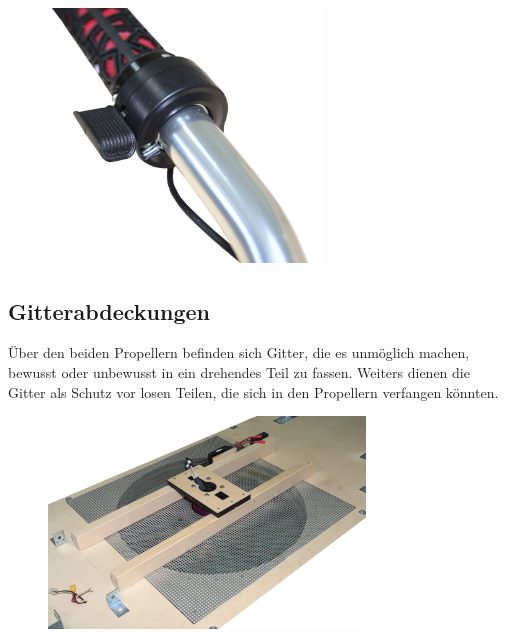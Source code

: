 \begin{figure}[h]
    \centering
    \includegraphics[width=0.65\textwidth]{Fotos/Daumengas.png}
\end{figure}

\newpage
\subsection{Gitterabdeckungen}
Über den beiden Propellern befinden sich Gitter, die es unmöglich machen, bewusst oder unbewusst in ein drehendes Teil zu fassen. 
Weiters dienen die Gitter als Schutz vor losen Teilen, die sich in den Propellern verfangen könnten. 

\begin{figure}[H]
    \centering
    \includegraphics[width=0.75\textwidth]{Fotos/Konstruktion/DSC_8718_gitter_unten.png}
\end{figure}


